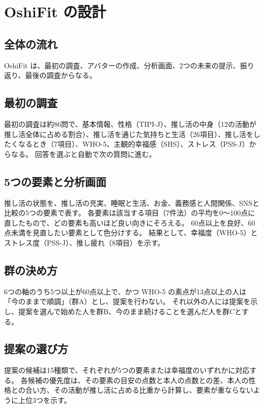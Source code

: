 \chapter{OshiFit の設計}
\section{全体の流れ}
OshiFit は、最初の調査、アバターの作成、分析画面、2つの未来の提示、振り返り、最後の調査からなる。

\section{最初の調査}
最初の調査は約86問で、基本情報、性格（TIPI-J）、推し活の中身（12の活動が推し活全体に占める割合）、推し活を通じた気持ちと生活（26項目）、推し活をしたくなるとき（7項目）、WHO-5、主観的幸福感（SHS）、ストレス（PSS-J）からなる。
回答を選ぶと自動で次の質問に進む。

\section{5つの要素と分析画面}
推し活の状態を、推し活の充実、睡眠と生活、お金、義務感と人間関係、SNSと比較の5つの要素で表す。
各要素は該当する項目（7件法）の平均を0〜100点に直したもので、どの要素も高いほど良い向きにそろえる。
60点以上を良好、60点未満を見直したい要素として色分けする。
結果として、幸福度（WHO-5）とストレス度（PSS-J）、推し疲れ（8項目）を示す。

\section{群の決め方}
6つの軸のうち5つ以上が60点以上で、かつ WHO-5 の素点が13点以上の人は「今のままで順調」（群A）とし、提案を行わない。
それ以外の人には提案を示し、提案を選んで始めた人を群B、今のまま続けることを選んだ人を群Cとする。

\section{提案の選び方}
提案の候補は15種類で、それぞれが5つの要素または幸福度のいずれかに対応する。
各候補の優先度は、その要素の目安の点数と本人の点数との差、本人の性格との合い方、その活動が推し活に占める比重から計算し、要素が重ならないように上位3つを示す。

